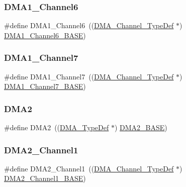 \subsubsection{\texorpdfstring{DMA1\_Channel6}{DMA1\_Channel6}}
{\footnotesize\ttfamily \#define D\+M\+A1\+\_\+\+Channel6~((\mbox{\hyperlink{struct_d_m_a___channel___type_def}{D\+M\+A\+\_\+\+Channel\+\_\+\+Type\+Def}} $\ast$) \mbox{\hyperlink{group___peripheral__memory__map_ga896c2c7585dd8bc3969cf8561f689d2d}{D\+M\+A1\+\_\+\+Channel6\+\_\+\+B\+A\+SE}})}

\mbox{\label{group___peripheral__declaration_ga4f9c23b3d1add93ed206b5c9afa5cda3}} 
\subsubsection{\texorpdfstring{DMA1\_Channel7}{DMA1\_Channel7}}
{\footnotesize\ttfamily \#define D\+M\+A1\+\_\+\+Channel7~((\mbox{\hyperlink{struct_d_m_a___channel___type_def}{D\+M\+A\+\_\+\+Channel\+\_\+\+Type\+Def}} $\ast$) \mbox{\hyperlink{group___peripheral__memory__map_gaeee0d1f77d0db1db533016a09351166c}{D\+M\+A1\+\_\+\+Channel7\+\_\+\+B\+A\+SE}})}

\mbox{\label{group___peripheral__declaration_ga506520140eec1708bc7570c49bdf972d}} 
\subsubsection{\texorpdfstring{DMA2}{DMA2}}
{\footnotesize\ttfamily \#define D\+M\+A2~((\mbox{\hyperlink{struct_d_m_a___type_def}{D\+M\+A\+\_\+\+Type\+Def}} $\ast$) \mbox{\hyperlink{group___peripheral__memory__map_gab72a9ae145053ee13d1d491fb5c1df64}{D\+M\+A2\+\_\+\+B\+A\+SE}})}

\mbox{\label{group___peripheral__declaration_gad86c75e1ff89e03e15570f47962865c8}} 
\subsubsection{\texorpdfstring{DMA2\_Channel1}{DMA2\_Channel1}}
{\footnotesize\ttfamily \#define D\+M\+A2\+\_\+\+Channel1~((\mbox{\hyperlink{struct_d_m_a___channel___type_def}{D\+M\+A\+\_\+\+Channel\+\_\+\+Type\+Def}} $\ast$) \mbox{\hyperlink{group___peripheral__memory__map_gad3bd6c4201d12f5d474518c1b02f8e3b}{D\+M\+A2\+\_\+\+Channel1\+\_\+\+B\+A\+SE}})}

